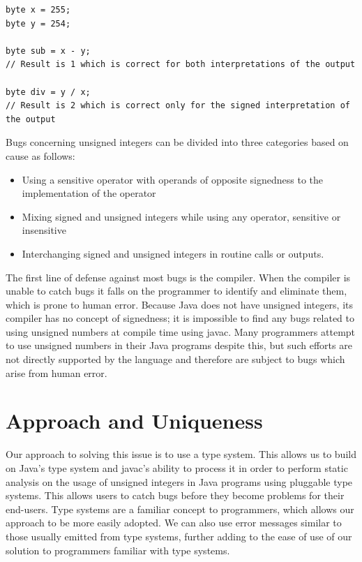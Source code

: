 \documentclass{sigplanconf}
\begin{document}
\begin{lstlisting}[caption=Example depicting subtraction\texttt{,} a sound operator\texttt{,} and division\texttt{,} an unsound operator.]
byte x = 255;
byte y = 254;

byte sub = x - y;
// Result is 1 which is correct for both interpretations of the output

byte div = y / x;
// Result is 2 which is correct only for the signed interpretation of the output
\end{lstlisting}

Bugs concerning unsigned integers can be divided into three categories based on cause as follows:

\begin{itemize}
  \item Using a sensitive operator with operands of opposite signedness to the implementation of the operator
  \item Mixing signed and unsigned integers while using any operator, sensitive or insensitive
  \item Interchanging signed and unsigned integers in routine calls or outputs.
\end{itemize}

The first line of defense against most bugs is the compiler. When the compiler is unable to catch bugs it falls on the programmer to identify and eliminate them, which is prone to human error. Because Java does not have unsigned integers, its compiler has no concept of signedness; it is impossible to find any bugs related to using unsigned numbers at compile time using javac. Many programmers attempt to use unsigned numbers in their Java programs despite this, but such efforts are not directly supported by the language and therefore are subject to bugs which arise from human error.

\section{Approach and Uniqueness}

Our approach to solving this issue is to use a type system. This allows us to build on Java's type system and javac's ability to process it in order to perform static analysis on the usage of unsigned integers in Java programs using pluggable type systems. This allows users to catch bugs before they become problems for their end-users. Type systems are a familiar concept to programmers, which allows our approach to be more easily adopted. We can also use error messages similar to those usually emitted from type systems, further adding to the ease of use of our solution to programmers familiar with type systems.
\end{document}
